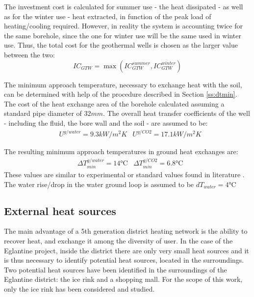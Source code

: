 \documentclass{article}
\begin{document}
The investment cost is calculated for summer use - the heat dissipated - as well as for the winter use - heat extracted, in function of the peak load of heating/cooling required. However, in reality the system is accounting twice for the same borehole, since the one for winter use will be the same used in winter use. Thus, the total cost for the geothermal wells is chosen as the larger value between the two:
\begin{equation}
IC_{GTW} = 	\max \left( IC_{GTW}^{summer}, IC_{GTW}^{winter} \right) 
\end{equation}

The minimum approach temperature, necessary to exchange heat with the soil, can be determined with help of the procedure described in Section \ref{ss:dtmin}. 
The cost of the heat exchange area of the borehole calculated assuming a standard pipe diameter of $32 mm$\cite{siaSIA384Sondes2010, kruseStatusDevelopmentResearcha}.
The overall heat transfer coefficients of the well - including the fluid, the bore wall and the soil - are assumed to be\cite{kruseStatusDevelopmentResearcha}:
\begin{align}
	& U^{g/water} = 9.3 kW/m^2K
	& U^{g/CO2} = 17.1 kW/m^2K
\end{align}

The resulting minimum approach temperatures in ground heat exchanges are:
\begin{align}
	&\Delta T_{min}^{g/water} = 14 \si{\celsius}
	&\Delta T_{min}^{g/CO2} = 6.8 \si{\celsius}
\end{align}
These values are similar to experimental or standard values found in literature \cite{siaSIA384Sondes2010, lamarcheReviewMethodsEvaluate2010}.\\

The water rise/drop in the water ground loop is assumed to be $dT_{water} = 4 \si{\celsius}$ \cite{siaSIA384Sondes2010}\\


\subsection{External heat sources}
The main advantage of a 5th generation district heating network is the ability to recover heat, and exchange it among the diversity of user. In the case of the Eglantine project, inside the district there are only very small heat sources and it is thus necessary to identify potential heat sources, located in the surroundings. 
Two potential heat sources have been identified in the surroundings of the Eglantine district: the ice rink and a shopping mall. For the scope of this work, only the ice rink has been considered and studied.
\end{document}
